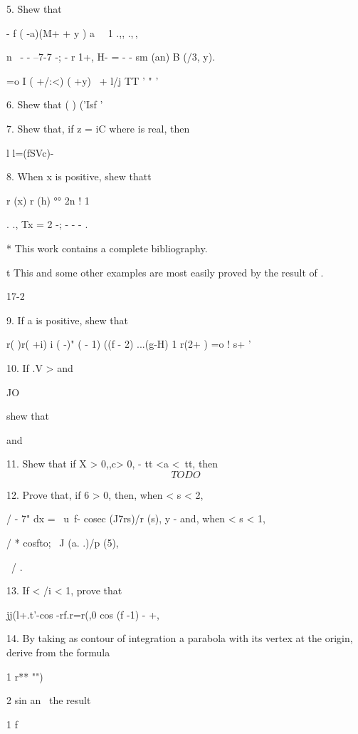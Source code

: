 5. Shew that

- f ( -a)(M+ + y ) a \ \ 1 .,, .,\,,

n \ - - --7-7 -; - r 1+, H- = - - sm (an) B (/3, y).

 =o I ( +/:<) ( +y) \ + l/j TT ' " '


6. Shew that ( ) ('Isf ' 

7. Shew that, if z = iC where is real, then

l l=\/(fSVc)- 

8. When x is positive, shew thatt

r (x) r (h) °° 2n ! 1

 . ., Tx = 2 -; - - - . 

* This work contains a complete bibliography.

t This and some other examples are most easily proved by the result of .

17-2

%
%

9. If a is positive, shew that

r( )r( +i) i ( -)" ( - 1) ((f - 2) ...(g-H) 1 r(2+ ) =o ! s+ '

10. If .V > and

JO

shew that

and

11. Shew that if X > 0,,c> 0, - tt <a <\ tt, then
$$
TODO
$$

12. Prove that, if 6 > 0, then, when < s < 2,

/ - 7" dx = \ u\ f- cosec (J7rs)/r (s), y - and, when < s < 1,

/ * cosfto; \ J (a. .)/p (5), 

\ / .

13. If < /i < 1, prove that

jj(l+.t'-cos -rf.r=r(,0 cos (f -1) - +,


14. By taking as contour of integration a parabola with its vertex at
the origin, derive from the formula

1 r** "")

2 sin an \ the result

1 f

